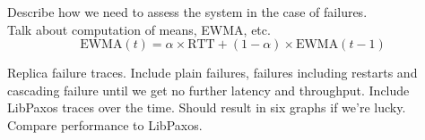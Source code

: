 Describe how we need to assess the system in the case of failures. \\

Talk about computation of means, EWMA, etc. \\

$$ \textrm{EWMA} \left( t \right) = \alpha \times \textrm{RTT} + (1 - \alpha ) \times \textrm{EWMA} \left( t - 1 \right)$$

{\color{blue}Replica failure traces. Include plain failures, failures including restarts and cascading failure until we get no further latency and throughput. Include LibPaxos traces over the time. Should result in six graphs if we're lucky.} \\

Compare performance to LibPaxos.





